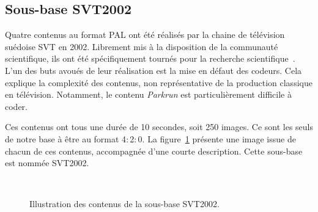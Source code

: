 \subsection{Sous-base SVT2002} \label{ssec:seq-svt}
Quatre contenus au format PAL ont été réalisés par la chaine de télévision suédoise SVT en 2002. Librement mis à la disposition de la communauté scientifique, ils ont été spécifiquement tournés pour la recherche scientifique~\cite{svt-assesstudy}. L'un des buts avoués de leur réalisation est la mise en défaut des codeurs. Cela explique la complexité des contenus, non représentative de la production classique en télévision. Notamment, le contenu \emph{Parkrun} est particulièrement difficile à coder.

Ces contenus ont tous une durée de 10 secondes, soit 250 images. Ce sont les seuls de notre base à être au format 4$:$2$:$0. La figure~\ref{fig:sequencesB} présente une image issue de chacun de ces contenus, accompagnée d'une courte description. Cette sous-base est nommée SVT2002.

\begin{figure}[htbp]
  \centering
  \hfill
  \hfill
  \hfill
  \\
  \caption{Illustration des contenus de la sous-base SVT2002.}
  \label{fig:sequencesB}
\end{figure}


